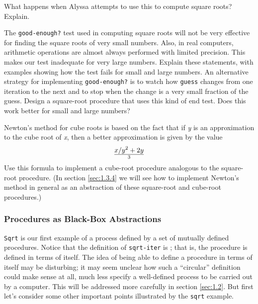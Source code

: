 \begin{schemedisplay}
\begin{Exercise}
What happens when Alyssa attempts to use this to compute square roots?
Explain.
\end{Exercise}

\begin{Exercise}
\label{exc:1.7}
The \texttt{good-enough?} test used in computing square roots will not
be very effective for finding the square roots of very small numbers.
Also, in real computers, arithmetic operations are almost always
performed with limited precision.  This makes our test inadequate for
very large numbers.  Explain these statements, with examples showing
how the test fails for small and large numbers.  An alternative
strategy for implementing \texttt{good-enough?} is to watch how
\texttt{guess} changes from one iteration to the next and to stop when
the change is a very small fraction of the guess.  Design a
square-root procedure that uses this kind of end test.  Does this work
better for small and large numbers?
\end{Exercise}

\begin{Exercise}
\label{exc:1.8}
Newton's method for cube roots is based on the fact that if \textit{y} is an
approximation to the cube root of \textit{x}, then a better approximation is
given by the value $$x / y^2 + 2y \over 3$$
Use this formula to implement a cube-root procedure analogous to the
square-root procedure.  (In section \ref{sec:1.3.4} we
will see how to implement Newton's method in general as an abstraction
of these square-root and cube-root procedures.)
\end{Exercise}

\subsubsection{Procedures as Black-Box Abstractions}
\label{sec:1.1.8}

\texttt{Sqrt} is our first example of a process defined by a set of
mutually defined procedures.  Notice that the definition of
\texttt{sqrt-iter} is ; that is, the procedure is
defined in terms of itself.  The idea of being able to define a
procedure in terms of itself may be disturbing; it may seem unclear
how such a ``circular'' definition could make sense at all, much less
specify a well-defined process to be carried out by a computer.  This
will be addressed more carefully in section \ref{sec:1.2}.  But first
let's consider some other important points illustrated by the
\texttt{sqrt} example.


\end{schemedisplay}
